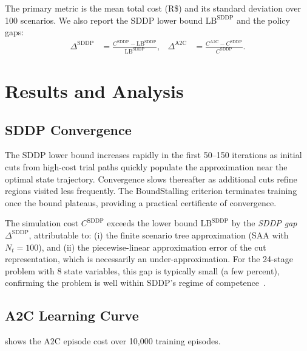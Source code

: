 \documentclass[11pt,letterpaper]{article}
\begin{document}
The primary metric is the mean total cost (R\$) and its standard deviation over
100 scenarios.  We also report the SDDP lower bound $\mathrm{LB}^{\mathrm{SDDP}}$
and the policy gaps:
\begin{align}
  \Delta^{\mathrm{SDDP}} &= \frac{C^{\mathrm{SDDP}} - \mathrm{LB}^{\mathrm{SDDP}}}
                                 {\mathrm{LB}^{\mathrm{SDDP}}}, &
  \Delta^{\mathrm{A2C}}  &= \frac{C^{\mathrm{A2C}} - C^{\mathrm{SDDP}}}
                                 {C^{\mathrm{SDDP}}}.
\end{align}

\section{Results and Analysis}
\label{sec:results}

\subsection{SDDP Convergence}

The SDDP lower bound increases rapidly in the first 50--150 iterations as
initial cuts from high-cost trial paths quickly populate the approximation near
the optimal state trajectory.  Convergence slows thereafter as additional cuts
refine regions visited less frequently.
The BoundStalling criterion terminates training once the bound plateaus,
providing a practical certificate of convergence.

The simulation cost $C^{\mathrm{SDDP}}$ exceeds the lower bound $\mathrm{LB}^{\mathrm{SDDP}}$
by the \emph{SDDP gap} $\Delta^{\mathrm{SDDP}}$, attributable to:
(i) the finite scenario tree approximation (SAA with $N_t = 100$), and
(ii) the piecewise-linear approximation error of the cut representation,
which is necessarily an under-approximation.
For the 24-stage problem with 8 state variables, this gap is typically small
(a few percent), confirming the problem is well within SDDP's regime of
competence~\citep{shapiro2013}.

\subsection{A2C Learning Curve}

 shows the A2C episode cost over 10{,}000 training episodes.
\end{document}
